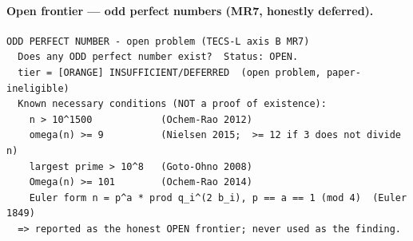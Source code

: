\documentclass[11pt,a4paper]{article}
\theoremstyle{definition}
\begin{document}
\paragraph{Open frontier --- odd perfect numbers (MR7, honestly deferred).}
\begin{verbatim}
ODD PERFECT NUMBER - open problem (TECS-L axis B MR7)
  Does any ODD perfect number exist?  Status: OPEN.
  tier = [ORANGE] INSUFFICIENT/DEFERRED  (open problem, paper-ineligible)
  Known necessary conditions (NOT a proof of existence):
    n > 10^1500            (Ochem-Rao 2012)
    omega(n) >= 9          (Nielsen 2015;  >= 12 if 3 does not divide n)
    largest prime > 10^8   (Goto-Ohno 2008)
    Omega(n) >= 101        (Ochem-Rao 2014)
    Euler form n = p^a * prod q_i^(2 b_i), p == a == 1 (mod 4)  (Euler 1849)
  => reported as the honest OPEN frontier; never used as the finding.
\end{verbatim}
\end{document}
